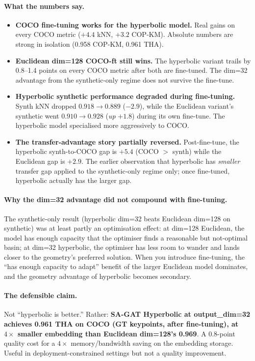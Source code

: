 \vspace{0.5em}

\paragraph{What the numbers say.}

\begin{itemize}
    \item \textbf{COCO fine-tuning works for the hyperbolic model.} Real gains on every COCO metric ($+4.4$ kNN, $+3.2$ COP-KM). Absolute numbers are strong in isolation (0.958 COP-KM, 0.961 THA).
    \item \textbf{Euclidean dim=128 COCO-ft still wins.} The hyperbolic variant trails by 0.8--1.4 points on every COCO metric after both are fine-tuned. The dim=32 advantage from the synthetic-only regime does not survive the fine-tune.
    \item \textbf{Hyperbolic synthetic performance degraded during fine-tuning.} Synth kNN dropped $0.918 \to 0.889$ ($-2.9$), while the Euclidean variant's synthetic went $0.910 \to 0.928$ (\emph{up} $+1.8$) during its own fine-tune. The hyperbolic model specialised more aggressively to COCO.
    \item \textbf{The transfer-advantage story partially reversed.} Post-fine-tune, the hyperbolic synth-to-COCO gap is $+5.4$ (COCO $>$ synth) while the Euclidean gap is $+2.9$. The earlier observation that hyperbolic has \emph{smaller} transfer gap applied to the synthetic-only regime only; once fine-tuned, hyperbolic actually has the larger gap.
\end{itemize}

\paragraph{Why the dim=32 advantage did not compound with fine-tuning.} The synthetic-only result (hyperbolic dim=32 beats Euclidean dim=128 on synthetic) was at least partly an optimisation effect: at dim=128 Euclidean, the model has enough capacity that the optimiser finds a reasonable but not-optimal basin; at dim=32 hyperbolic, the optimiser has less room to wander and lands closer to the geometry's preferred solution. When you introduce fine-tuning, the ``has enough capacity to adapt'' benefit of the larger Euclidean model dominates, and the geometry advantage of hyperbolic becomes secondary.

\paragraph{The defensible claim.} Not ``hyperbolic is better.'' Rather: \textbf{SA-GAT Hyperbolic at output\_dim=32 achieves 0.961 THA on COCO (GT keypoints, after fine-tuning), at $4\times$ smaller embedding than Euclidean dim=128's 0.969}. A $0.8$-point quality cost for a $4\times$ memory/bandwidth saving on the embedding storage. Useful in deployment-constrained settings but not a quality improvement.

